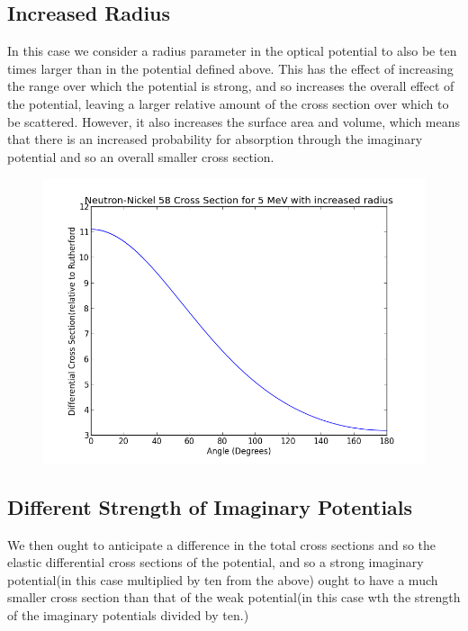 \documentclass[paper=a4, fontsize=11pt]{scrartcl} %
\numberwithin{equation}{section} %
\numberwithin{figure}{section} %
\numberwithin{table}{section} %
\begin{document}
\subsection{Increased Radius}

In this case we consider a radius parameter in the optical potential to also be ten times larger than in the potential defined above. This has the effect of increasing the range over which the potential is strong, and so increases the overall effect of the potential, leaving a larger relative amount of the cross section over which to be scattered. However, it also increases the surface area and volume, which means that there is an increased probability for absorption through the imaginary potential and so an overall smaller cross section.

\begin{figure}[hbt]
\centering
\includegraphics[width=\textwidth]{NeutronRad.png}
\end{figure}

\subsection{Different Strength of Imaginary Potentials}

We then ought to anticipate a difference in the total cross sections and so the elastic differential cross sections of the potential, and so a strong imaginary potential(in this case multiplied by ten from the above) ought to have a much smaller cross section than that of the weak potential(in this case wth the strength of the imaginary potentials divided by ten.)
\end{document}
